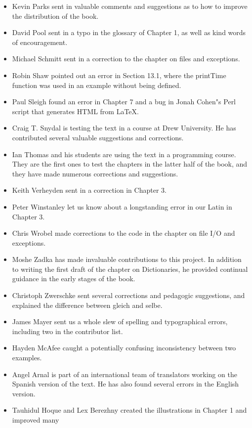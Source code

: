 \begin{itemize}
\item Kevin Parks sent in valuable comments and suggestions as to how to improve the distribution 
of the book. 
\item David Pool sent in a typo in the glossary of Chapter 1, as well as kind words of encouragement. 
\item Michael Schmitt sent in a correction to the chapter on files and exceptions. 
\item Robin Shaw pointed out an error in Section 13.1, where the printTime function was used in an 
example without being defined. 
\item Paul Sleigh found an error in Chapter 7 and a bug in Jonah Cohen"s Perl script that generates 
HTML from LaTeX. 
\item Craig T. Snydal is testing the text in a course at Drew University. 
He has contributed several 
valuable suggestions and corrections. 
\item Ian Thomas and his students are using the text in a programming course. They are the first ones 
to test the chapters in the latter half of the book, and they have made numerous corrections and 
suggestions. 
\item Keith Verheyden sent in a correction in Chapter 3. 
\item Peter Winstanley let us know about a longstanding error in our Latin in Chapter 3. 
\item Chris Wrobel made corrections to the code in the chapter on file I/O and exceptions. 
\item Moshe Zadka has made invaluable contributions to this project. In addition to writing the first 
draft of the chapter on Dictionaries, he provided continual guidance in the early stages of the 
book. 
\item Christoph Zwerschke sent several corrections and pedagogic suggestions, and explained the 
difference between gleich and selbe. 
\item James Mayer sent us a whole slew of spelling and typographical errors, including two in the 
contributor list. 
\item Hayden McAfee caught a potentially confusing inconsistency between two examples. 
\item Angel Arnal is part of an international team of translators working on the Spanish version of 
the text. He has also found several errors in the English version. 
\item Tauhidul Hoque and Lex Berezhny created the illustrations in Chapter 1 and improved many 

\end{itemize}
